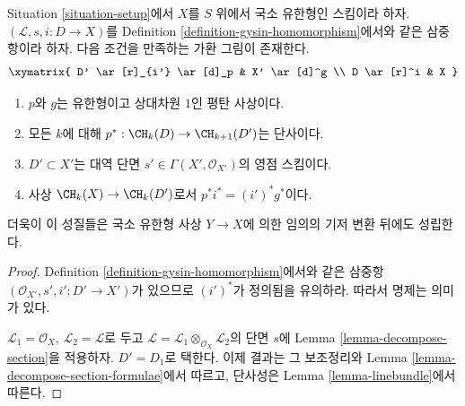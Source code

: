 \begin{lemma}
\label{lemma-normal-cone-effective-Cartier}
Situation \ref{situation-setup}에서 $X$를 $S$ 위에서 국소 유한형인
스킴이라 하자. $(\mathcal{L}, s, i : D \to X)$를 Definition
\ref{definition-gysin-homomorphism}에서와 같은 삼중항이라 하자. 다음
조건을 만족하는 가환 그림이 존재한다.
$$
\xymatrix{
D' \ar[r]_{i'} \ar[d]_p & X' \ar[d]^g \\
D \ar[r]^i & X
}
$$
\begin{enumerate}
\item $p$와 $g$는 유한형이고 상대차원 $1$인 평탄 사상이다.
\item 모든 $k$에 대해 $p^* : \CH_k(D) \to \CH_{k + 1}(D')$는
단사이다.
\item $D' \subset X'$는 대역 단면
$s' \in \Gamma(X', \mathcal{O}_{X'})$의 영점 스킴이다.
\item 사상 $\CH_k(X) \to \CH_k(D')$로서
$p^*i^* = (i')^*g^*$이다.
\end{enumerate}
더욱이 이 성질들은 국소 유한형 사상 $Y \to X$에 의한 임의의 기저
변환 뒤에도 성립한다.
\end{lemma}

\begin{proof}
Definition \ref{definition-gysin-homomorphism}에서와 같은 삼중항
$(\mathcal{O}_{X'}, s', i' : D' \to X')$가 있으므로 $(i')^*$가 정의됨을
유의하라. 따라서 명제는 의미가 있다.

\medskip\noindent
$\mathcal{L}_1 = \mathcal{O}_X$, $\mathcal{L}_2 = \mathcal{L}$로 두고
$\mathcal{L} = \mathcal{L}_1 \otimes_{\mathcal{O}_X} \mathcal{L}_2$의
단면 $s$에 Lemma \ref{lemma-decompose-section}을 적용하자.
$D' = D_1$로 택한다. 이제 결과는 그 보조정리와 Lemma
\ref{lemma-decompose-section-formulae}에서 따르고, 단사성은 Lemma
\ref{lemma-linebundle}에서 따른다.
\end{proof}

